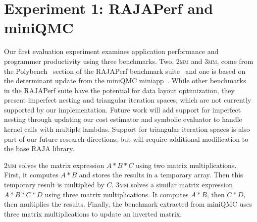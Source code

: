 \documentclass[sigconf,review=true]{acmart}
\begin{document}
\section{Experiment 1: RAJAPerf and miniQMC}
\label{sec:Experiment1}

Our first evaluation experiment examines application performance and programmer productivity using three benchmarks.
Two, \textsc{2mm} and \textsc{3mm}, come from the Polybench~\cite{pouchet2012polybench} section of the RAJAPerf benchmark suite~\cite{hornung2017raja} and one is based on the determinant update from the miniQMC miniapp~\cite{richards2018fy18}.
While other benchmarks in the RAJAPerf suite have the potential for data layout optimization, they present imperfect nesting and triangular iteration spaces, which are not currently supported by our implementation. 
Future work will add support for imperfect nesting through updating our cost estimator and symbolic evaluator to handle kernel calls with multiple lambdas. 
Support for triangular iteration spaces is also part of our future research directions, but will require additional modification to the base RAJA library.



\textsc{2mm} solves the matrix expression $A*B*C$ using two matrix multiplications. 
First, it computes $A*B$ and stores the results in a temporary array.
Then this temporary result is multiplied by $C$.
\textsc{3mm} solves a similar matrix expression $A*B*C*D$ using three matrix multiplications.
It computes $A*B$, then $C*D$, then multiplies the results.
Finally, the benchmark extracted from miniQMC uses three matrix multiplications to update an inverted matrix. 
\end{document}
